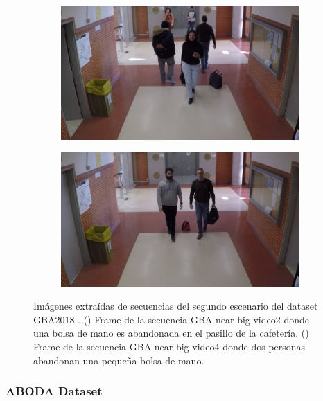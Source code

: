 \begin{figure}[ht!]
  \centering
  \begin{subfigure}[b]{0.4\textwidth}
    \includegraphics[width=\textwidth]{img/chapters/resultados/datasets/GBA_3.jpg}
    \caption{}
    \label{fig:GBA_3}
  \end{subfigure}
  \qquad\qquad
  \begin{subfigure}[b]{0.4\textwidth}
    \includegraphics[width=\textwidth]{img/chapters/resultados/datasets/GBA_4.jpg}
    \caption{}
    \label{fig:GBA_4}
  \end{subfigure}
  \caption{Imágenes extraídas de secuencias del segundo escenario del dataset GBA2018 \cite{gba-dataset}.
    (\protect{}) Frame de la secuencia GBA-near-big-video2 donde una bolsa de mano es abandonada en el pasillo de la cafetería.
    (\protect{}) Frame de la secuencia GBA-near-big-video4 donde dos personas abandonan una pequeña bolsa de mano.}
  \label{fig:GBA2}
\end{figure}

\newpage

\subsubsection{ABODA Dataset}

